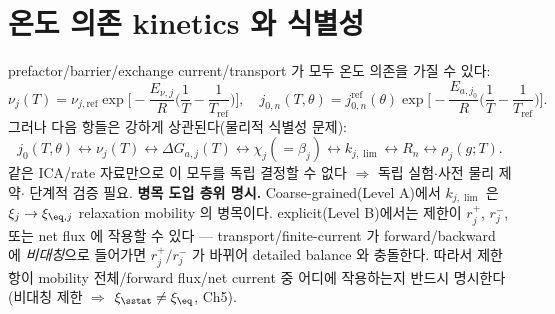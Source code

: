 \section{온도 의존 kinetics 와 식별성}\label{sec:ch3_ident}
prefactor/barrier/exchange current/transport 가 모두 온도 의존을 가질 수 있다:
\begin{equation}
\nu_j(T)=\nu_{j,\mathrm{ref}}\exp\!\Big[-\frac{E_{\nu,j}}{R}\Big(\frac1T-\frac1{T_{\mathrm{ref}}}\Big)\Big],\quad
j_{0,n}(T,\theta)=j_{0,n}^{\mathrm{ref}}(\theta)\exp\!\Big[-\frac{E_{a,j_0}}{R}\Big(\frac1T-\frac1{T_{\mathrm{ref}}}\Big)\Big].
\label{eq:ch3_T}
\end{equation}
그러나 다음 항들은 강하게 상관된다(물리적 식별성 문제):
\begin{equation}
j_0(T,\theta)\leftrightarrow\nu_j(T)\leftrightarrow\Delta G_{a,j}(T)\leftrightarrow\chi_j(=\beta_j)\leftrightarrow k_{j,\lim}\leftrightarrow R_n\leftrightarrow\rho_j(g;T).
\label{eq:ch3_ident_chain}
\end{equation}
같은 ICA/rate 자료만으로 이 모두를 독립 결정할 수 없다 $\Rightarrow$ 독립 실험$\cdot$사전 물리 제약$\cdot$
단계적 검증 필요. \textbf{병목 도입 층위 명시.} Coarse-grained(Level A)에서 $k_{j,\lim}$ 은
$\xi_j\to\xi_{\eq,j}$ relaxation mobility 의 병목이다. explicit(Level B)에서는 제한이 $r_j^+$, $r_j^-$,
또는 net flux 에 작용할 수 있다 — transport/finite-current 가 forward/backward 에 \emph{비대칭}으로 들어가면
$r_j^+/r_j^-$ 가 바뀌어 detailed balance 와 충돌한다. 따라서 제한항이 mobility 전체/forward flux/net current
중 어디에 작용하는지 반드시 명시한다(비대칭 제한 $\Rightarrow$ $\xi_{\sstat}\ne\xi_{\eq}$, Ch5).


